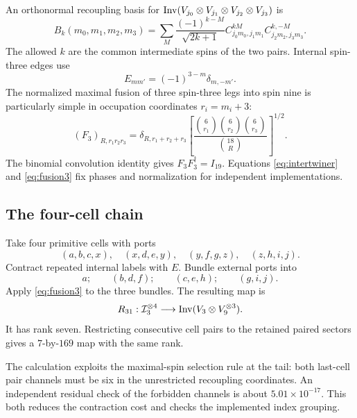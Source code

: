 An orthonormal recoupling basis for $\operatorname{Inv}(V_{j_0}\otimes V_{j_1}\otimes V_{j_2}\otimes V_{j_3})$ is
\begin{equation}
B_k(m_0,m_1,m_2,m_3)
=\sum_M\frac{(-1)^{k-M}}{\sqrt{2k+1}}
C^{kM}_{j_0m_0,j_1m_1}
C^{k,-M}_{j_2m_2,j_3m_3}.
\label{eq:intertwiner}
\end{equation}
The allowed $k$ are the common intermediate spins of the two pairs. Internal spin-three edges use
\begin{equation}
E_{mm'}=(-1)^{3-m}\delta_{m,-m'}.
\end{equation}
The normalized maximal fusion of three spin-three legs into spin nine is particularly simple in occupation coordinates $r_i=m_i+3$:
\begin{equation}
(F_3)_{R,r_1r_2r_3}
=\delta_{R,r_1+r_2+r_3}
\left[
\frac{\binom6{r_1}\binom6{r_2}\binom6{r_3}}
{\binom{18}R}
\right]^{1/2}.
\label{eq:fusion3}
\end{equation}
The binomial convolution identity gives $F_3F_3^\dagger=I_{19}$. Equations \eqref{eq:intertwiner} and \eqref{eq:fusion3} fix phases and normalization for independent implementations.

\subsection{The four-cell chain}

Take four primitive cells with ports
\begin{equation}
(a,b,c,x),\quad(x,d,e,y),\quad(y,f,g,z),\quad(z,h,i,j).
\end{equation}
Contract repeated internal labels with $E$. Bundle external ports into
\begin{equation}
a;\qquad(b,d,f);\qquad(c,e,h);\qquad(g,i,j).
\end{equation}
Apply \eqref{eq:fusion3} to the three bundles. The resulting map is
\begin{equation}
R_{31}:\mathcal I_3^{\otimes4}
\longrightarrow\operatorname{Inv}(V_3\otimes V_9^{\otimes3}).
\end{equation}
It has rank seven. Restricting consecutive cell pairs to the retained paired sectors gives a $7$-by-$169$ map with the same rank.

The calculation exploits the maximal-spin selection rule at the tail: both last-cell pair channels must be six in the unrestricted recoupling coordinates. An independent residual check of the forbidden channels is about $5.01\times10^{-17}$. This both reduces the contraction cost and checks the implemented index grouping.

